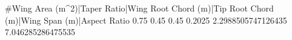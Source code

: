 #Wing Area (m^2)|Taper Ratio|Wing Root Chord (m)|Tip Root Chord (m)|Wing Span (m)|Aspect Ratio
0.75 0.45 0.45 0.2025 2.2988505747126435 7.046285286475535
